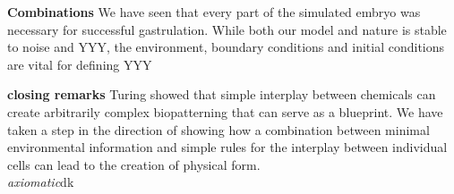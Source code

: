 \textbf{Combinations}
We have seen that every part of the simulated embryo was necessary for successful gastrulation. 
While both our model and nature is stable to noise and YYY, the environment, boundary conditions and initial conditions are vital for defining YYY

\textbf{closing remarks}
Turing showed that simple interplay between chemicals can create arbitrarily complex biopatterning that can serve as a blueprint. We have taken a step in the direction of showing how a combination between minimal environmental information and simple rules for the interplay between individual cells can lead to the creation of physical form. \\


\textit{axiomatic}dk